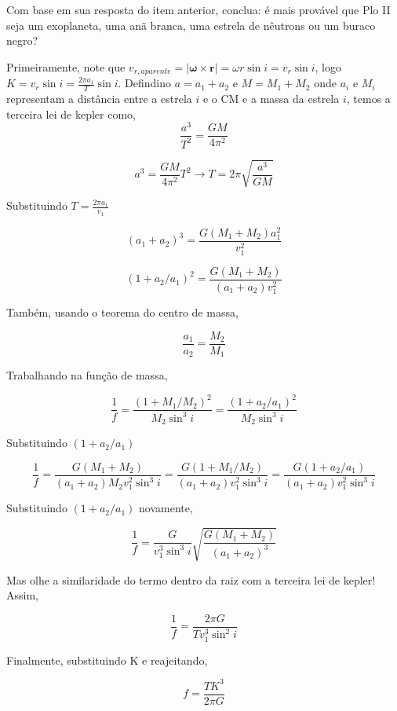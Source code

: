 \documentclass[11pt]{article}
\begin{document}
\begin{pproblem}
\begin{alternativas}
        \item Com base em sua resposta do item anterior, conclua: é mais provável que Plo II seja um exoplaneta, uma anã branca, uma estrela de nêutrons ou um buraco negro?
    \end{alternativas}
    \begin{pssolution*}{}{}
        \begin{alternativas}
            \item Primeiramente, note que \(v_{r, aparente} = |\mathbf{\omega}\times\mathbf{r}| = \omega r \sin i = v_r \sin i\), logo \(K = v_r\sin i = \frac{2\pi a_1}{T}\sin i\). Defindino \(a=a_1+a_2\) e \(M = M_1+M_2\) onde \(a_i\) e \(M_i\) representam a distância entre a estrela \(i\) e o CM e a massa da estrela \(i\), temos a terceira lei de kepler como, 
            \[\frac{a^3}{T^2} = \frac{GM}{4\pi^2}\]

            \[a^3 = \frac{GM}{4\pi^2}T^2 \rightarrow T = 2\pi \sqrt{\frac{a^3}{GM}}\]

            Substituindo $T = \frac{2\pi a_1}{v_1}$

            $$(a_1+a_2)^3= \frac{G(M_1+M_2)a_1^2}{v_1^2}$$

            $$(1+a_2/a_1)^2 = \frac{G(M_1+M_2)}{(a_1+a_2)v_1^2}$$

            Também, usando o teorema do centro de massa, 

            $$\frac{a_1}{a_2} = \frac{M_2}{M_1}$$

            Trabalhando na função de massa, 

            $$\frac{1}{f} = \frac{(1+M_1/M_2)^2}{M_2\sin^3 i} = \frac{(1+a_2/a_1)^2}{M_2\sin^3i}$$

            Substituindo $(1+a_2/a_1)$

            $$\frac{1}{f} = \frac{G(M_1+M_2)}{(a_1+a_2)M_2v_1^2\sin^3i} = \frac{G(1+M_1/M_2)}{(a_1+a_2)v_1^2\sin^3i} = \frac{G(1+a_2/a_1)}{(a_1+a_2)v_1^2\sin^3i}$$

            Substituindo $(1+a_2/a_1)$ novamente, 

            $$\frac{1}{f} = \frac{G}{v_1^3\sin^3i}\sqrt{\frac{G(M_1+M_2)}{(a_1+a_2)^3}}$$

            Mas olhe a similaridade do termo dentro da raiz com a terceira lei de kepler! Assim, 

            $$\frac{1}{f} = \frac{2\pi G }{T v_1^3\sin^2i}$$

            Finalmente, substituindo K e reajeitando, 

            $$\boxed{f = \frac{TK^3}{2\pi G}}$$


\end{alternativas}
\end{pssolution*}
\end{pproblem}
\end{document}
